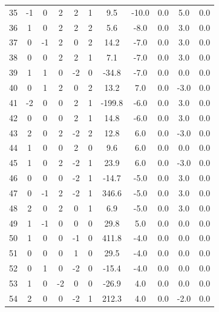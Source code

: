 \documentclass [12pt, a4paper] {article}
\begin{document}
\begin {center}
\begin {longtable}{| c | c c c c c | c | c | c | c | r |}
      35 & -1&   0&   2&   2&   1&       9.5&     -10.0&       0.0&       5.0&       0.0 \\
      36 & 1&   0&   2&   2&   2&       5.6&      -8.0&       0.0&       3.0&       0.0 \\
      37 & 0&  -1&   2&   0&   2&      14.2&      -7.0&       0.0&       3.0&       0.0 \\
      38 & 0&   0&   2&   2&   1&       7.1&      -7.0&       0.0&       3.0&       0.0 \\
      39 & 1&   1&   0&  -2&   0&     -34.8&      -7.0&       0.0&       0.0&       0.0 \\
      40 & 0&   1&   2&   0&   2&      13.2&       7.0&       0.0&      -3.0&       0.0 \\
      41 & -2&   0&   0&   2&   1&    -199.8&      -6.0&       0.0&       3.0&       0.0 \\
      42 & 0&   0&   0&   2&   1&      14.8&      -6.0&       0.0&       3.0&       0.0 \\
      43 & 2&   0&   2&  -2&   2&      12.8&       6.0&       0.0&      -3.0&       0.0 \\
      44 & 1&   0&   0&   2&   0&       9.6&       6.0&       0.0&       0.0&       0.0 \\
      45 & 1&   0&   2&  -2&   1&      23.9&       6.0&       0.0&      -3.0&       0.0 \\
      46 & 0&   0&   0&  -2&   1&     -14.7&      -5.0&       0.0&       3.0&       0.0 \\
      47 & 0&  -1&   2&  -2&   1&     346.6&      -5.0&       0.0&       3.0&       0.0 \\
      48 & 2&   0&   2&   0&   1&       6.9&      -5.0&       0.0&       3.0&       0.0 \\
      49 & 1&  -1&   0&   0&   0&      29.8&       5.0&       0.0&       0.0&       0.0 \\
      50 & 1&   0&   0&  -1&   0&     411.8&      -4.0&       0.0&       0.0&       0.0 \\
      51 & 0&   0&   0&   1&   0&      29.5&      -4.0&       0.0&       0.0&       0.0 \\
      52 & 0&   1&   0&  -2&   0&     -15.4&      -4.0&       0.0&       0.0&       0.0 \\
      53 & 1&   0&  -2&   0&   0&     -26.9&       4.0&       0.0&       0.0&       0.0 \\
      54 & 2&   0&   0&  -2&   1&     212.3&       4.0&       0.0&      -2.0&       0.0 \\

\end{longtable}
\end{center}
\end{document}
